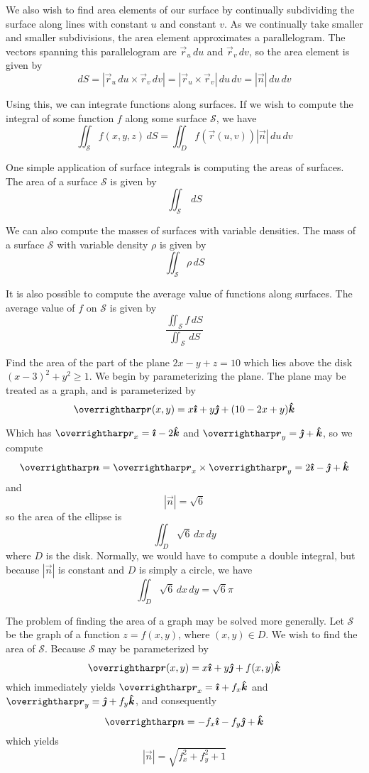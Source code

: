 \documentclass[../main.tex]{subfiles}
\begin{document}
    We also wish to find area elements of our surface by continually subdividing the surface along lines with constant \(u\) and constant \(v\). As we continually take smaller and smaller subdivisions, the area element approximates a parallelogram. The vectors spanning this parallelogram are \(\vec{r}_u\,du\) and \(\vec{r}_v\,dv\), so the area element is given by
    \[
    dS=|\vec{r}_u\,du\times\vec{r}_v\,dv|=|\vec{r}_u\times\vec{r}_v|\,du\,dv=|\vec{n}|\,du\,dv
    \]

    Using this, we can integrate functions along surfaces. If we wish to compute the integral of some function \(f\) along some surface \(\mathcal{S}\), we have
    \[
    \iint_\mathcal{S}f(x,y,z)\,dS=\iint_Df(\vec{r}(u,v))|\vec{n}|\,du\,dv
    \]

    One simple application of surface integrals is computing the areas of surfaces. The area of a surface \(\mathcal{S}\) is given by
    \[
    \iint_\mathcal{S}\,dS
    \]

    We can also compute the masses of surfaces with variable densities. The mass of a surface \(\mathcal{S}\) with variable density \(\rho\) is given by
    \[
    \iint_\mathcal{S}\rho\,dS
    \]

    It is also possible to compute the average value of functions along surfaces. The average value of \(f\) on \(\mathcal{S}\) is given by
    \[
    \frac{\iint_\mathcal{S}f\,dS}{\iint_\mathcal{S}\,dS}
    \]
    
    \begin{example}{}{}
        Find the area of the part of the plane \(2x-y+z=10\) which lies above the disk \((x-3)^2+y^2\geq1\).
        \tcblower
        We begin by parameterizing the plane. The plane may be treated as a graph, and is parameterized by
        \[
        \vec{r}(x,y)=x\i+y\j+(10-2x+y)\k
        \]

        Which has \(\vec{r}_x=\i-2\k\) and \(\vec{r}_y=\j+\k\), so we compute
        \[
        \vec{n}=\vec{r}_x\times\vec{r}_y=2\i-\j+\k
        \]
        and
        \[
        |\vec{n}|=\sqrt{6}
        \]
        so the area of the ellipse is
        \[
        \iint_D\sqrt{6}\,dx\,dy
        \]
        where \(D\) is the disk. Normally, we would have to compute a double integral, but because \(|\vec{n}|\) is constant and \(D\) is simply a circle, we have
        \[
        \iint_D\sqrt{6}\,dx\,dy=\sqrt{6}\pi
        \]
    \end{example}

        The problem of finding the area of a graph may be solved more generally. Let \(\mathcal{S}\) be the graph of a function \(z=f(x,y)\), where \((x,y)\in D\). We wish to find the area of \(\mathcal{S}\). Because \(\mathcal{S}\) may be parameterized by
        \[
        \vec{r}(x,y)=x\i+y\j+f(x,y)\k
        \]
        which immediately yields \(\vec{r}_x=\i+f_x\k\) and \(\vec{r}_y=\j+f_y\k\), and consequently
        \[
        \vec{n}=-f_x\i-f_y\j+\k
        \]
        which yields
        \[
        |\vec{n}|=\sqrt{f_x^2+f_y^2+1}
        \]
\end{document}
